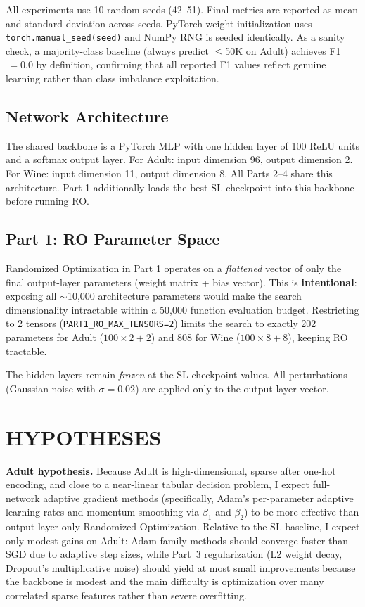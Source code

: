 \documentclass[letterpaper, 10 pt, conference]{ieeeconf}
\begin{document}
All experiments use 10 random seeds (42--51). Final metrics are reported as mean and standard deviation across seeds. PyTorch weight initialization uses \texttt{torch.manual\_seed(seed)} and NumPy RNG is seeded identically. As a sanity check, a majority-class baseline (always predict $\leq$50K on Adult) achieves F1$\,=0.0$ by definition, confirming that all reported F1 values reflect genuine learning rather than class imbalance exploitation.

\subsection{Network Architecture}

The shared backbone is a PyTorch MLP with one hidden layer of 100 ReLU units and a softmax output layer. For Adult: input dimension 96, output dimension 2. For Wine: input dimension 11, output dimension 8. All Parts 2--4 share this architecture. Part 1 additionally loads the best SL checkpoint into this backbone before running RO.

\subsection{Part 1: RO Parameter Space}

Randomized Optimization in Part 1 operates on a \emph{flattened} vector of only the final output-layer parameters (weight matrix + bias vector). This is \textbf{intentional}: exposing all $\sim$10{,}000 architecture parameters would make the search dimensionality intractable within a 50{,}000 function evaluation budget. Restricting to 2 tensors (\texttt{PART1\_RO\_MAX\_TENSORS=2}) limits the search to exactly 202 parameters for Adult ($100\times2 + 2$) and 808 for Wine ($100\times8 + 8$), keeping RO tractable.

The hidden layers remain \emph{frozen} at the SL checkpoint values. All perturbations (Gaussian noise with $\sigma = 0.02$) are applied only to the output-layer vector.

\section{HYPOTHESES}

\textbf{Adult hypothesis.} Because Adult is high-dimensional, sparse after one-hot encoding, and close to a near-linear tabular decision problem, I expect full-network adaptive gradient methods (specifically, Adam's per-parameter adaptive learning rates and momentum smoothing via $\beta_1$ and $\beta_2$) to be more effective than output-layer-only Randomized Optimization. Relative to the SL baseline, I expect only modest gains on Adult: Adam-family methods should converge faster than SGD due to adaptive step sizes, while Part~3 regularization (L2 weight decay, Dropout's multiplicative noise) should yield at most small improvements because the backbone is modest and the main difficulty is optimization over many correlated sparse features rather than severe overfitting.
\end{document}
